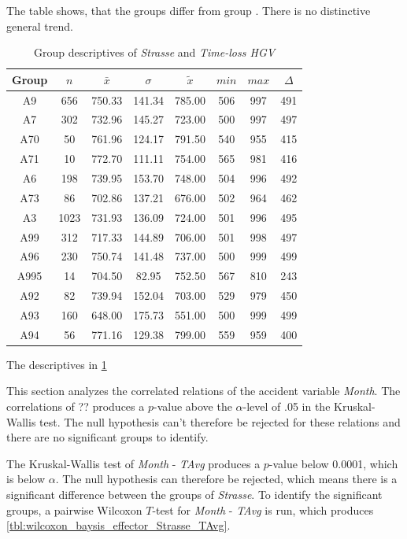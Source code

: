 The table shows, that the groups differ from group . There is no distinctive general trend.
\begin{table}[ht!]
	\tiny
	\centering
	\begin{tabular}{c|c|c|c|c|c|c|c}
		\toprule
		Group & $n$ & $\bar{x}$ & $\sigma$ & $\tilde{x}$ & $min$ & $max$ & $\Delta$ \\
		\midrule
		A9   & 656  & 750.33 & 141.34 & 785.00 & 506 & 997 & 491 \\ 
		A7   & 302  & 732.96 & 145.27 & 723.00 & 500 & 997 & 497 \\ 
		A70  & 50   & 761.96 & 124.17 & 791.50 & 540 & 955 & 415 \\ 
		A71  & 10   & 772.70 & 111.11 & 754.00 & 565 & 981 & 416 \\ 
		A6   & 198  & 739.95 & 153.70 & 748.00 & 504 & 996 & 492 \\ 
		A73  & 86   & 702.86 & 137.21 & 676.00 & 502 & 964 & 462 \\ 
		A3   & 1023 & 731.93 & 136.09 & 724.00 & 501 & 996 & 495 \\ 
		A99  & 312  & 717.33 & 144.89 & 706.00 & 501 & 998 & 497 \\ 
		A96  & 230  & 750.74 & 141.48 & 737.00 & 500 & 999 & 499 \\ 
		A995 & 14   & 704.50 & 82.95  & 752.50 & 567 & 810 & 243 \\ 
		A92  & 82   & 739.94 & 152.04 & 703.00 & 529 & 979 & 450 \\ 
		A93  & 160  & 648.00 & 175.73 & 551.00 & 500 & 999 & 499 \\ 
		A94  & 56   & 771.16 & 129.38 & 799.00 & 559 & 959 & 400 \\ 
		\bottomrule
	\end{tabular}
	\caption{Group descriptives of \textit{Strasse} and \textit{Time-loss HGV}}
	\label{tbl:descriptives_arbis_matched_Strasse_TMax}
\end{table}
The descriptives in \cref{tbl:descriptives_arbis_matched_Strasse_TMax}

This section analyzes the correlated relations of the accident variable \textit{Month}. The correlations of ?? produces a $p$-value above the $\alpha$-level of .05 in the Kruskal-Wallis test. The null hypothesis can't therefore be rejected for these relations and there are no significant groups to identify.

The Kruskal-Wallis test of \textit{Month} - \textit{TAvg} produces a $p$-value below 0.0001, which is below $\alpha$. The null hypothesis can therefore be rejected, which means there is a significant difference between the groups of \textit{Strasse}. To identify the significant groups, a pairwise Wilcoxon $T$-test for \textit{Month} - \textit{TAvg} is run, which produces \cref{tbl:wilcoxon_baysis_effector_Strasse_TAvg}. 

